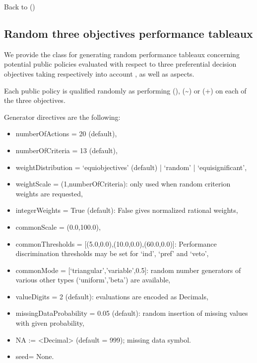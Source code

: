 \documentclass[a4paper,12pt,english]{sphinxhowto}
\begin{document}
Back to {\hyperref[\detokenize{tutorial:tutorial-label}]{}} ()


\subsection{Random three objectives performance tableaux}
\label{\detokenize{tutorial:random-three-objectives-performance-tableaux}}
We provide the  class for generating random performance tableaux concerning potential public policies evaluated with respect to three preferential decision objectives taking respectively into account ,  as well as  aspects.

Each public policy is qualified randomly as performing  (\sphinxhyphen{}),  (\textasciitilde{}) or  (+) on each of the three objectives.

Generator directives are the following:
\begin{itemize}
\item {} 
numberOfActions = 20 (default),

\item {} 
numberOfCriteria = 13 (default),

\item {} 
weightDistribution = ‘equiobjectives’ (default) | ‘random’ | ‘equisignificant’,

\item {} 
weightScale = (1,numberOfCriteria): only used when random criterion weights are requested,

\item {} 
integerWeights = True (default): False gives normalized rational weights,

\item {} 
commonScale = (0.0,100.0),

\item {} 
commonThresholds = {[}(5.0,0.0),(10.0,0.0),(60.0,0.0){]}: Performance discrimination thresholds may be set for ‘ind’, ‘pref’ and ‘veto’,

\item {} 
commonMode = {[}‘triangular’,’variable’,0.5{]}: random number generators of various other types (‘uniform’,’beta’) are available,

\item {} 
valueDigits = 2 (default): evaluations are encoded as Decimals,

\item {} 
missingDataProbability = 0.05 (default): random insertion of missing values with given probability,

\item {} 
NA := \textless{}Decimal\textgreater{} (default = \sphinxhyphen{}999); missing data symbol.

\item {} 
seed= None.

\end{itemize}
\end{document}

